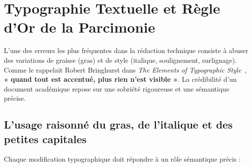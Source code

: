 \section{Typographie Textuelle et Règle d'Or de la Parcimonie}
\label{sec:typographie_parcimonie}

L'une des erreurs les plus fréquentes dans la rédaction technique consiste à abuser des variations de graisse (gras) et de style (italique, soulignement, surlignage).
Comme le rappelait Robert Bringhurst dans \emph{The Elements of Typographic Style}~\cite{bringhurst2004elements}, \textbf{« quand tout est accentué, plus rien n'est visible »}.
La crédibilité d'un document académique repose sur une sobriété rigoureuse et une sémantique précise.

\subsection{L'usage raisonné du gras, de l'italique et des petites capitales}
\label{subsec:usages_styles}

Chaque modification typographique doit répondre à un rôle sémantique précis :


